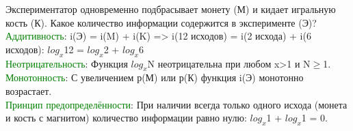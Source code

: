 \newpage
\rhead{\textbf{\textcolor{blue}{А}\textcolor{gray}{нализ свойств меры Хартли}}}
\vspace*{2mm}
\newline
Экспериментатор одновременно подбрасывает монету (М) и кидает игральную кость (К). Какое количество информации содержится в эксперименте (Э)?\\
\vspace*{2mm}
\textcolor{Green}{Аддитивность}:
\quad i(Э) = i(M) + i(K) => i(12 исходов) = i(2 исхода) + i(6 исходов): $log_x$12 = $log_x$2 + $log_x$6\\
\textcolor{Green}{Неотрицательность}:
\quad Функция $log_x$N неотрицательна при любом x>1 и N$\geqslant$1.\\
\textcolor{Green}{Монотонность}:
\quad С увеличением р(М) или р(К) функция i(Э) монотонно возрастает.\\
\textcolor{Green}{Принцип предопределённости}:
\quad При наличии всегда только одного исхода (монета и кость с магнитом) количество информации равно нулю: $log_x$1 + $log_x$1 = 0.